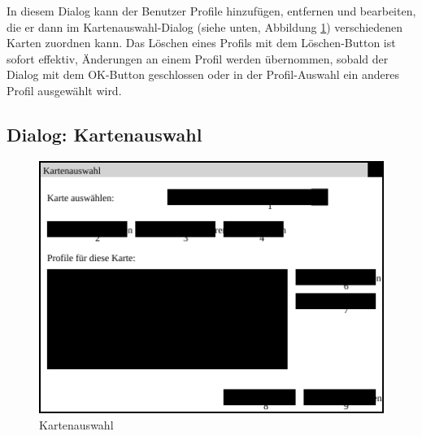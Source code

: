 \documentclass[a4paper, 11pt]{article}
\begin{document}
In diesem Dialog kann der Benutzer Profile hinzufügen, entfernen und bearbeiten, die er dann im Kartenauswahl-Dialog (siehe unten, Abbildung \ref{fig:mockupkartenauswahl}) verschiedenen Karten zuordnen kann. Das Löschen eines Profils mit dem Löschen-Button ist sofort effektiv, Änderungen an einem Profil werden übernommen, sobald der Dialog mit dem OK-Button geschlossen oder in der Profil-Auswahl ein anderes Profil ausgewählt wird.

\subsection{Dialog: Kartenauswahl}
\begin{figure}[H]
\centering
\includegraphics[width=0.7\linewidth]{Kartenauswahl}
\caption{Kartenauswahl}
\label{fig:mockupkartenauswahl}
\end{figure}
\end{document}
